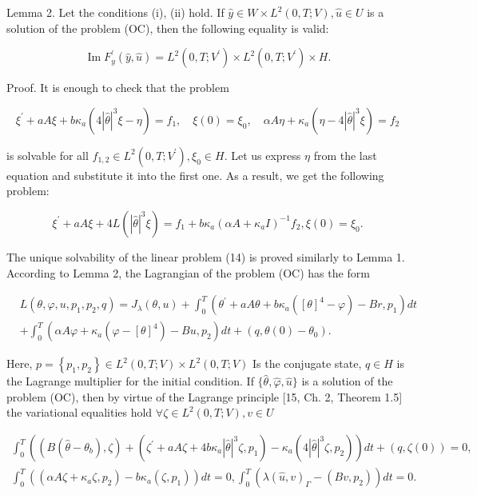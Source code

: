 \documentclass[10pt]{article}
\begin{document}
Lemma 2. Let the conditions (i), (ii) hold. If $\widehat{y} \in W \times L^{2}(0, T ; V), \widehat{u} \in U$ is a solution of the problem (OC), then the following equality is valid:

$$
\operatorname{Im} F_{y}^{\prime}(\widehat{y}, \widehat{u})=L^{2}\left(0, T ; V^{\prime}\right) \times L^{2}\left(0, T ; V^{\prime}\right) \times H .
$$

Proof. It is enough to check that the problem

$$
\xi^{\prime}+a A \xi+b \kappa_{a}\left(4|\widehat{\theta}|^{3} \xi-\eta\right)=f_{1}, \quad \xi(0)=\xi_{0}, \quad \alpha A \eta+\kappa_{a}\left(\eta-4|\widehat{\theta}|^{3} \xi\right)=f_{2}
$$

is solvable for all $f_{1,2} \in L^{2}\left(0, T ; V^{\prime}\right), \xi_{0} \in H$. Let us express $\eta$ from the last equation and substitute it into the first one. As a result, we get the following problem:

$$
\xi^{\prime}+a A \xi+4 L\left(|\widehat{\theta}|^{3} \xi\right)=f_{1}+b \kappa_{a}\left(\alpha A+\kappa_{a} I\right)^{-1} f_{2}, \xi(0)=\xi_{0} .
$$

The unique solvability of the linear problem (14) is proved similarly to Lemma 1. According to Lemma 2, the Lagrangian of the problem (OC) has the form

$$
\begin{aligned}
& L\left(\theta, \varphi, u, p_{1}, p_{2}, q\right)=J_{\lambda}(\theta, u)+\int_{0}^{T}\left(\theta^{\prime}+a A \theta+b \kappa_{a}\left([\theta]^{4}-\varphi\right)-B r, p_{1}\right) d t \\
&+\int_{0}^{T}\left(\alpha A \varphi+\kappa_{a}\left(\varphi-[\theta]^{4}\right)-B u, p_{2}\right) d t+\left(q, \theta(0)-\theta_{0}\right) .
\end{aligned}
$$

Here, $p=\left\{p_{1}, p_{2}\right\} \in L^{2}(0, T ; V) \times L^{2}(0, T ; V)$ Is the conjugate state, $q \in H$ is the Lagrange multiplier for the initial condition. If $\{\widehat{\theta}, \widehat{\varphi}, \widehat{u}\}$ is a solution of the problem (OC), then by virtue of the Lagrange principle [15, Ch. 2, Theorem 1.5] the variational equalities hold $\forall \zeta \in L^{2}(0, T ; V), v \in U$

$$
\begin{gathered}
\int_{0}^{T}\left(\left(B\left(\widehat{\theta}-\theta_{b}\right), \zeta\right)+\left(\zeta^{\prime}+a A \zeta+4 b \kappa_{a}|\widehat{\theta}|^{3} \zeta, p_{1}\right)-\kappa_{a}\left(4|\widehat{\theta}|^{3} \zeta, p_{2}\right)\right) d t+(q, \zeta(0))=0, \\
\int_{0}^{T}\left(\left(\alpha A \zeta+\kappa_{a} \zeta, p_{2}\right)-b \kappa_{a}\left(\zeta, p_{1}\right)\right) d t=0, \int_{0}^{T}\left(\lambda(\widehat{u}, v)_{\Gamma}-\left(B v, p_{2}\right)\right) d t=0 .
\end{gathered}
$$
\end{document}
